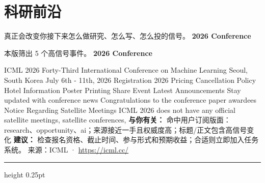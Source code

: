 \documentclass[10.5pt]{ctexart}
\begin{document}
\section*{科研前沿}
{\color{ormuted} 真正会改变你接下来怎么做研究、怎么写、怎么投的信号。}
\vspace{2mm}
{\LARGE\bfseries 2026 Conference}\par
\vspace{1mm}
{\color{ormuted} 本版筛出 5 个高信号事件。}
\vspace{3mm}
{\Large\bfseries 2026 Conference}\par
ICML 2026 Forty-Third International Conference on Machine Learning Seoul, South Korea July 6th - 11th, 2026 Registration 2026 Pricing Cancellation Policy Hotel Information Poster Printing Share Event Latest Announcements Stay updated with conference news Congratulations to the conference paper awardees Notice Regarding Satellite Meetings ICML 2026 does not have any official satellite meetings, satellite conferences, 
\textbf{与你有关：} 命中用户订阅版面：research、opportunity、ai；来源接近一手且权威度高；标题/正文包含高信号变化
\textbf{建议：} 检查报名资格、截止时间、参与形式和预期收益；合适则立即加入任务系统。
{\footnotesize\color{ormuted} 来源：ICML · \url{https://icml.cc/}}
\vspace{4mm}
\hrule height 0.25pt
\vspace{3mm}
\end{document}
